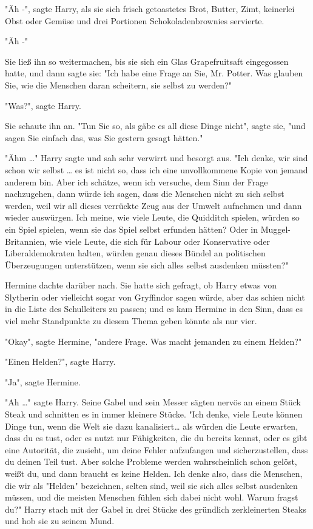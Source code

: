 {"Äh -", sagte Harry, als sie sich frisch getoastetes Brot, Butter, Zimt, keinerlei Obst oder Gemüse und drei Portionen Schokoladenbrownies servierte.

"Äh -"

Sie ließ ihn so weitermachen, bis sie sich ein Glas Grapefruitsaft eingegossen hatte, und dann sagte sie: "Ich habe eine Frage an Sie, Mr. Potter. Was glauben Sie, wie die Menschen daran scheitern, sie selbst zu werden?"

"Was?", sagte Harry.

Sie schaute ihn an. "Tun Sie so, als gäbe es all diese Dinge nicht", sagte sie, "und sagen Sie einfach das, was Sie gestern gesagt hätten."

"Ähm …" Harry sagte und sah sehr verwirrt und besorgt aus. "Ich denke, wir sind schon wir selbst … es ist nicht so, dass ich eine unvollkommene Kopie von jemand anderem bin. Aber ich schätze, wenn ich versuche, dem Sinn der Frage nachzugehen, dann würde ich sagen, dass die Menschen nicht zu sich selbst werden, weil wir all dieses verrückte Zeug aus der Umwelt aufnehmen und dann wieder auswürgen. Ich meine, wie viele Leute, die Quidditch spielen, würden so ein Spiel spielen, wenn sie das Spiel selbst erfunden hätten? Oder in Muggel-Britannien, wie viele Leute, die sich für Labour oder Konservative oder Liberaldemokraten halten, würden genau dieses Bündel an politischen Überzeugungen unterstützen, wenn sie sich alles selbst ausdenken müssten?"

Hermine dachte darüber nach. Sie hatte sich gefragt, ob Harry etwas von Slytherin oder vielleicht sogar von Gryffindor sagen würde, aber das schien nicht in die Liste des Schulleiters zu passen; und es kam Hermine in den Sinn, dass es viel mehr Standpunkte zu diesem Thema geben könnte als nur vier.

"Okay", sagte Hermine, "andere Frage. Was macht jemanden zu einem Helden?"

"Einen Helden?", sagte Harry.

"Ja", sagte Hermine.

"Ah …" sagte Harry. Seine Gabel und sein Messer sägten nervös an einem Stück Steak und schnitten es in immer kleinere Stücke. "Ich denke, viele Leute können Dinge tun, wenn die Welt sie dazu kanalisiert… als würden die Leute erwarten, dass du es tust, oder es nutzt nur Fähigkeiten, die du bereits kennst, oder es gibt eine Autorität, die zusieht, um deine Fehler aufzufangen und sicherzustellen, dass du deinen Teil tust. Aber solche Probleme werden wahrscheinlich schon gelöst, weißt du, und dann braucht es keine Helden. Ich denke also, dass die Menschen, die wir als "Helden" bezeichnen, selten sind, weil sie sich alles selbst ausdenken müssen, und die meisten Menschen fühlen sich dabei nicht wohl. Warum fragst du?" Harry stach mit der Gabel in drei Stücke des gründlich zerkleinerten Steaks und hob sie zu seinem Mund.

}
